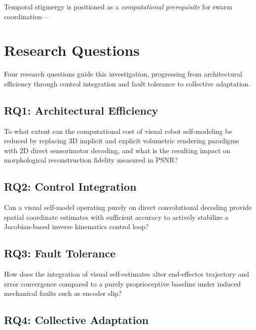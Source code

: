 \documentclass[12pt,a4paper,oneside]{report}
\begin{document}
\begin{sloppypar}
Temporal stigmergy is positioned as a \textit{computational prerequisite} for swarm coordination---
\end{sloppypar}

\section{Research Questions}
\label{sec:research_questions_intro}

Four research questions guide this investigation, progressing from architectural efficiency through control integration and fault tolerance to collective adaptation.

\subsection{RQ1: Architectural Efficiency}
\label{subsec:RQ1_intro}

To what extent can the computational cost of visual robot self-modeling be reduced by replacing 3D implicit and explicit volumetric rendering paradigms with 2D direct sensorimotor decoding, and what is the resulting impact on morphological reconstruction fidelity measured in PSNR?

\subsection{RQ2: Control Integration}
\label{subsec:RQ2_intro}

Can a visual self-model operating purely on direct convolutional decoding provide spatial coordinate estimates with sufficient accuracy to actively stabilize a Jacobian-based inverse kinematics control loop?

\subsection{RQ3: Fault Tolerance}
\label{subsec:RQ3_intro}

How does the integration of visual self-estimates alter end-effector trajectory and error convergence compared to a purely proprioceptive baseline under induced mechanical faults such as encoder slip?

\subsection{RQ4: Collective Adaptation}
\label{subsec:RQ4_intro}
\end{document}
